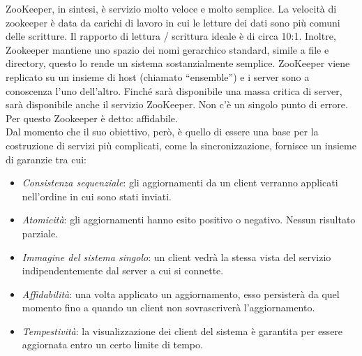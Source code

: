ZooKeeper, in sintesi, è servizio molto veloce e molto semplice. La velocità di zookeeper è data da carichi di lavoro in cui le letture dei dati sono più comuni delle scritture. Il rapporto di lettura / scrittura ideale è di circa 10:1. Inoltre, Zookeeper mantiene uno spazio dei nomi gerarchico standard, simile a file e directory, questo lo rende un sistema sostanzialmente semplice. ZooKeeper viene replicato su un insieme di host (chiamato “ensemble”) e i server sono a conoscenza l'uno dell'altro. Finché sarà disponibile una massa critica di server, sarà disponibile anche il servizio ZooKeeper. Non c'è un singolo punto di errore. Per questo Zookeeper è detto: affidabile.
\\Dal momento che il suo obiettivo, però, è quello di essere una base per la costruzione di servizi più complicati, come la sincronizzazione, fornisce un insieme di garanzie tra cui:
\begin{itemize}
\item \textit{Consistenza sequenziale}: gli aggiornamenti da un client verranno applicati nell'ordine in cui sono stati inviati.
\item \textit{Atomicità}: gli aggiornamenti hanno esito positivo o negativo. Nessun risultato parziale.
\item \textit{Immagine del sistema singolo}: un client vedrà la stessa vista del servizio indipendentemente dal server a cui si connette.
\item \textit{Affidabilità}: una volta applicato un aggiornamento, esso persisterà da quel momento fino a quando un client non sovrascriverà l'aggiornamento.
\item \textit{Tempestività}: la visualizzazione dei client del sistema è garantita per essere aggiornata entro un certo limite di tempo.
\end{itemize}

